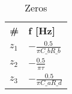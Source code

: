 \begin{table}[H]
\centering
\begin{tabular}[c]{ll}
\textbf{\#} & \textbf{f [Hz]} \\ 
\rowcolor{myyellow}
$z_{1}$ &\small{$- \frac{0.5}{\pi C\_{b} R\_{b}}$} \\ 
$z_{2}$ &\small{$- \frac{0.5}{\pi \tau}$} \\ 
\rowcolor{myyellow}
$z_{3}$ &\small{$- \frac{0.5}{\pi C\_{a} R\_{d}}$} \\ 
\end{tabular}
\caption{Zeros}
\end{table}

